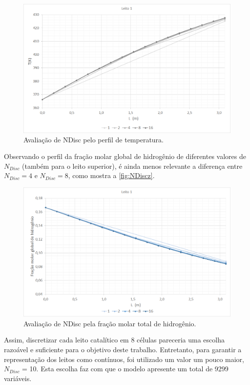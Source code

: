 \begin{figure}[htb] \centering
\includegraphics[scale=0.4]{images/Chap4/NDiscT.png}
\caption{Avaliação de NDisc pelo perfil de temperatura.}
\label{fig:NDiscT}
\end{figure}

Observando o perfil da fração molar global de hidrogênio de diferentes valores
de $N_{Disc}$ (também para o leito superior), é ainda menos relevante a
diferença entre $N_{Disc} = 4$ e $N_{Disc} = 8$, como mostra a
\autoref{fig:NDiscz}.

\begin{figure}[htb]
\centering \includegraphics[scale=0.4]{images/Chap4/NDiscz.png}
\caption{Avaliação de NDisc pela fração molar total de hidrogênio.}
\label{fig:NDiscz}
\end{figure}

Assim, discretizar cada leito catalítico em \num{8} células pareceria uma
escolha razoável e suficiente para o objetivo deste trabalho. Entretanto, para
garantir a representação dos leitos como contínuos, foi utilizado um valor um
pouco maior, $N_{Disc}$ = \num{10}. Esta escolha faz com que o modelo apresente
um total de \num{9299} variáveis.

